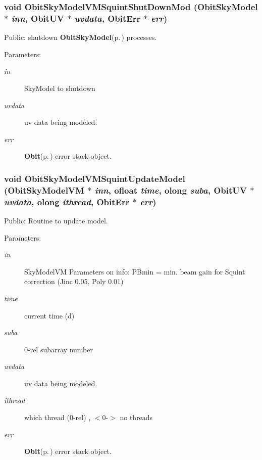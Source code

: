 \subsubsection{\setlength{\rightskip}{0pt plus 5cm}void Obit\-Sky\-Model\-VMSquint\-Shut\-Down\-Mod ({\bf Obit\-Sky\-Model} $\ast$ {\em inn}, {\bf Obit\-UV} $\ast$ {\em uvdata}, {\bf Obit\-Err} $\ast$ {\em err})}\label{ObitSkyModelVMSquint_8h_a8}


Public: shutdown {\bf Obit\-Sky\-Model}{\rm (p.\,\pageref{structObitSkyModel})} processes. 

\begin{Desc}
\item[Parameters:]
\begin{description}
\item[{\em in}]Sky\-Model to shutdown \item[{\em uvdata}]uv data being modeled. \item[{\em err}]{\bf Obit}{\rm (p.\,\pageref{structObit})} error stack object. \end{description}
\end{Desc}
\subsubsection{\setlength{\rightskip}{0pt plus 5cm}void Obit\-Sky\-Model\-VMSquint\-Update\-Model ({\bf Obit\-Sky\-Model\-VM} $\ast$ {\em inn}, {\bf ofloat} {\em time}, {\bf olong} {\em suba}, {\bf Obit\-UV} $\ast$ {\em uvdata}, {\bf olong} {\em ithread}, {\bf Obit\-Err} $\ast$ {\em err})}\label{ObitSkyModelVMSquint_8h_a13}


Public: Routine to update model. 

\begin{Desc}
\item[Parameters:]
\begin{description}
\item[{\em in}]Sky\-Model\-VM Parameters on info: PBmin = min. beam gain for Squint correction (Jinc 0.05, Poly 0.01) \item[{\em time}]current time (d) \item[{\em suba}]0-rel subarray number \item[{\em uvdata}]uv data being modeled. \item[{\em ithread}]which thread (0-rel) , $<$0-$>$ no threads \item[{\em err}]{\bf Obit}{\rm (p.\,\pageref{structObit})} error stack object. \end{description}
\end{Desc}
